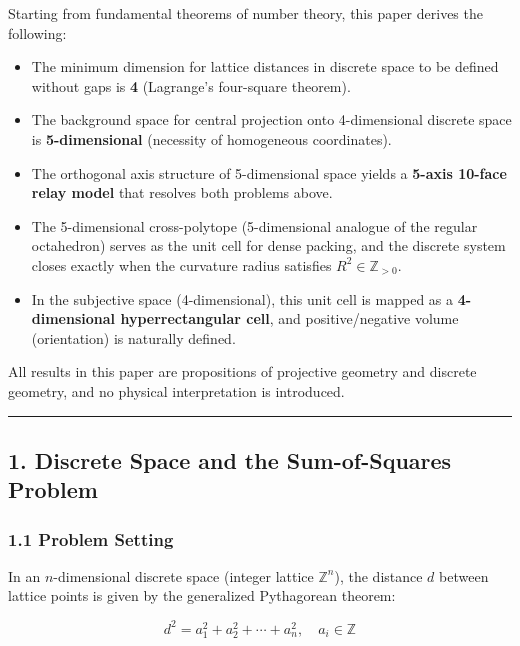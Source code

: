 \documentclass[a4paper,11pt]{article}
\providecommand{\tightlist}{\setlength{\itemsep}{0pt}\setlength{\parskip}{0pt}}
\begin{document}
Starting from fundamental theorems of number theory, this paper derives
the following:

\begin{itemize}
\tightlist
\item
  The minimum dimension for lattice distances in discrete space to be
  defined without gaps is \textbf{4} (Lagrange's four-square theorem).
\item
  The background space for central projection onto 4-dimensional
  discrete space is \textbf{5-dimensional} (necessity of homogeneous
  coordinates).
\item
  The orthogonal axis structure of 5-dimensional space yields a
  \textbf{5-axis 10-face relay model} that resolves both problems above.
\item
  The 5-dimensional cross-polytope (5-dimensional analogue of the
  regular octahedron) serves as the unit cell for dense packing, and the
  discrete system closes exactly when the curvature radius satisfies
  \(R^2 \in \mathbb{Z}_{>0}\).
\item
  In the subjective space (4-dimensional), this unit cell is mapped as a
  \textbf{4-dimensional hyperrectangular cell}, and positive/negative
  volume (orientation) is naturally defined.
\end{itemize}

All results in this paper are propositions of projective geometry and
discrete geometry, and no physical interpretation is introduced.

\begin{center}\rule{0.5\linewidth}{0.5pt}\end{center}

\subsection{1. Discrete Space and the Sum-of-Squares
Problem}\label{discrete-space-and-the-sum-of-squares-problem}

\subsubsection{1.1 Problem Setting}\label{problem-setting}

In an \(n\)-dimensional discrete space (integer lattice
\(\mathbb{Z}^n\)), the distance \(d\) between lattice points is given by
the generalized Pythagorean theorem:

\[d^2 = a_1^2 + a_2^2 + \cdots + a_n^2, \quad a_i \in \mathbb{Z}\]
\end{document}
